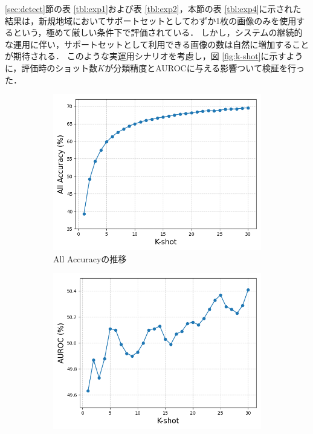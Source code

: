 \documentclass[a4paper,11pt,nomag]{jsreport}
\begin{document}
\ref{sec:detect}節の表 \ref{tbl:exp1}および表 \ref{tbl:exp2}，本節の表 \ref{tbl:exp4}に示された結果は，新規地域においてサポートセットとしてわずか1枚の画像のみを使用するという，極めて厳しい条件下で評価されている．
しかし，システムの継続的な運用に伴い，サポートセットとして利用できる画像の数は自然に増加することが期待される．
このような実運用シナリオを考慮し，図 \ref{fig:k-shot}に示すように，評価時のショット数$K$が分類精度とAUROCに与える影響ついて検証を行った．
% 
\begin{figure}[tbp]
  \centering
  \begin{subfigure}[b]{0.45\linewidth}
    \centering
    \includegraphics[height=0.9\linewidth, keepaspectratio]{image/sec2k-shotVSaccuracy.png}
    \caption{All Accuracyの推移}
    \label{fig:sec2Accuracy}
  \end{subfigure}
  \hfill
  \begin{subfigure}[b]{0.45\linewidth}
    \centering
    \includegraphics[height=0.9\linewidth, keepaspectratio]{image/sec2k-shotVSAUROC.png}

\end{subfigure}
\end{figure}
\end{document}
